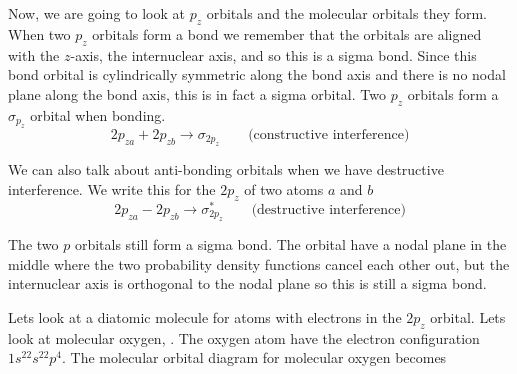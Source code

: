 \documentclass[../mit-general-chemistry.tex]{subfiles}
\begin{document}
Now, we are going to look at $p_z$ orbitals and the molecular orbitals
they form. When two $p_z$ orbitals form a bond we remember that the
orbitals are aligned with the $z$-axis, the internuclear axis, and so
this is a sigma bond. Since this bond orbital is cylindrically
symmetric along the bond axis and there is no nodal plane along the
bond axis, this is in fact a sigma orbital. Two $p_z$ orbitals form a
$\sigma_{p_z}$ orbital when bonding.
\begin{equation*}
  2p_{za} + 2p_{zb} \longrightarrow \sigma_{2p_z}\qquad\text{(constructive interference)}
\end{equation*}

We can also talk about anti-bonding orbitals when we have destructive
interference. We write this for the $2p_z$ of two atoms $a$ and $b$
\begin{equation*}
  2p_{za} - 2p_{zb} \longrightarrow \sigma^*_{2p_z}\qquad\text{(destructive interference)}
\end{equation*}

The two $p$ orbitals still form a sigma bond. The orbital have a nodal
plane in the middle where the two probability density functions cancel
each other out, but the internuclear axis is orthogonal to the nodal
plane so this is still a sigma bond.

Lets look at a diatomic molecule for atoms with electrons in the
$2p_z$ orbital. Lets look at molecular oxygen, . The oxygen
atom have the electron configuration $1s^22s^22p^4$. The molecular
orbital diagram for molecular oxygen becomes
\end{document}
